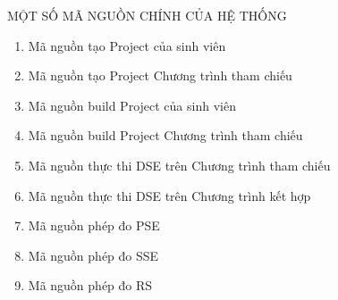 MỘT SỐ MÃ NGUỒN CHÍNH CỦA HỆ THỐNG
\begin{enumerate}
\item	Mã nguồn tạo Project của sinh viên

\item	Mã nguồn tạo Project Chương trình tham chiếu

\item	Mã nguồn build Project của sinh viên

\item	Mã nguồn build Project Chương trình tham chiếu

\item	Mã nguồn thực thi DSE trên Chương trình tham chiếu

\item	Mã nguồn thực thi DSE trên Chương trình kết hợp

\item	Mã nguồn phép đo PSE

\item	Mã nguồn phép đo SSE

\item	Mã nguồn phép đo RS

\end{enumerate}
